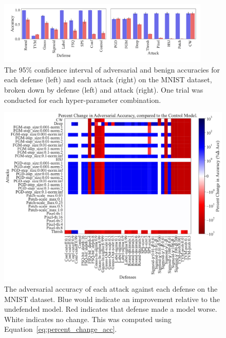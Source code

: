 \documentclass[journal]{IEEEtran}
\begin{document}
\begin{figure}[!htbp]
    {\centering
    \includegraphics[trim={0 0.85em 0 0.5em},clip,width=0.9\textwidth]{images/mnist/accuracy_plot.pdf}
    \vspace{-1em}
    \caption{The 95\% confidence interval of adversarial and benign accuracies for each defense (left) and each attack (right) on the MNIST dataset, broken down by defense (left) and attack (right). One trial was conducted for each hyper-parameter combination.}
    \label{fig:mnist_acc}
    } %
\end{figure}



\begin{figure}[!htbp]
    {\centering
    \includegraphics[trim={0 0.85em 0 0.35em},clip,height=0.58\textwidth]{images/mnist/acc_grid.pdf}
    \vspace{-0.5em}
    \caption{The adversarial accuracy of each attack against each defense on the MNIST dataset. Blue would indicate an improvement relative to the undefended model. Red indicates that defense made a model worse. White indicates no change. This was computed using Equation~\ref{eq:percent_change_acc}.}
    \label{fig:mnist_adv_acc_grid}
    } %
\end{figure}
\end{document}
